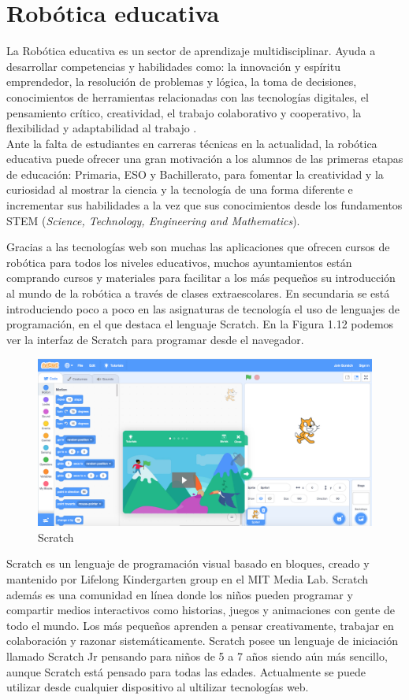 \section{Robótica educativa}

La Robótica educativa es un sector de aprendizaje multidisciplinar. Ayuda a desarrollar competencias y habilidades como: la innovación y espíritu emprendedor, la resolución de problemas y lógica, la toma de decisiones, conocimientos de herramientas relacionadas con las tecnologías digitales, el pensamiento crítico, creatividad, el trabajo colaborativo y cooperativo, la flexibilidad y adaptabilidad al trabajo \cite{roboticaedu}.
\\
Ante la falta de estudiantes en carreras técnicas en la actualidad, la robótica educativa puede ofrecer una gran motivación a los alumnos de las primeras etapas de educación: Primaria, ESO y Bachillerato, para fomentar la creatividad y la curiosidad al mostrar la ciencia y la tecnología de una forma diferente e incrementar sus habilidades a la vez que sus conocimientos desde los fundamentos STEM (\textit{Science, Technology, Engineering and Mathematics}).

Gracias a las tecnologías web son muchas las  aplicaciones que ofrecen cursos de robótica para todos los niveles educativos, muchos ayuntamientos están comprando cursos y materiales para facilitar a los más pequeños su introducción al mundo de la robótica a través de clases extraescolares. En secundaria se está introduciendo poco a poco en las asignaturas de tecnología el uso de lenguajes de programación, en el que destaca el lenguaje Scratch. En la Figura 1.12 podemos ver la interfaz de Scratch para programar desde el navegador.
\begin{figure}[H]
    \centering
    \includegraphics[width=0.8\columnwidth]{chapters/images/scratch.png}
    \caption{Scratch}
    \label{fig:my_label}
\end{figure}

Scratch es un lenguaje de programación visual basado en bloques, creado y  mantenido por Lifelong Kindergarten group en el MIT Media Lab. Scratch además es una comunidad en línea donde los niños pueden programar y compartir medios interactivos como historias, juegos y animaciones con gente de todo el mundo. Los más pequeños aprenden a pensar creativamente, trabajar en colaboración y razonar sistemáticamente\cite{scratch}. Scratch posee un lenguaje de iniciación llamado Scratch Jr pensando para niños de 5 a 7 años siendo aún más sencillo, aunque Scratch está pensado para todas las edades. Actualmente se puede utilizar desde cualquier dispositivo al ultilizar tecnologías web.

